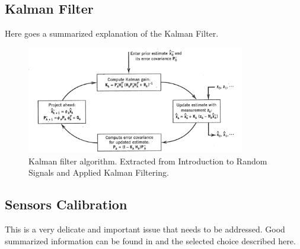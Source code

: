 \documentclass[a4paper,10pt]{article}
\begin{document}
\subsection{Kalman Filter}
Here goes a summarized explanation of the Kalman Filter.
\begin{figure}[!ht]
 \centering
 \includegraphics[width=0.85\textwidth]{./fig/kalman_loop.png}
 \caption{Kalman filter algorithm. Extracted from Introduction to Random Signals and Applied Kalman Filtering.}
 \label{fig:kalmanLoop}
\end{figure}

\subsection{Sensors Calibration}
This is a very delicate and important issue that needs to be addressed. Good summarized information can be found in \cite{Cucu2012} and the selected choice described here.
\end{document}
